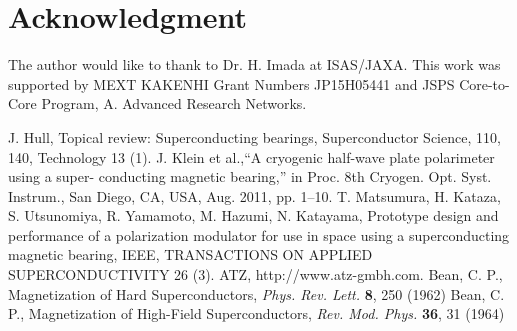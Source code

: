 \documentclass[journal]{IEEEtran}
\begin{document}
\section*{Acknowledgment}
The author would like to thank to Dr. H. Imada at ISAS/JAXA. This work was supported by MEXT KAKENHI Grant Numbers JP15H05441 and JSPS Core-to-Core Program, A. Advanced Research Networks.

\ifCLASSOPTIONcaptionsoff
  \newpage
\fi





%
%
%
\begin{thebibliography}{99}

J. Hull, Topical review: Superconducting bearings, Superconductor Science, 110, 140, Technology 13 (1).
J. Klein et al.,“A cryogenic half-wave plate polarimeter using a super- conducting magnetic bearing,” in Proc. 8th Cryogen. Opt. Syst. Instrum., San Diego, CA, USA, Aug. 2011, pp. 1–10.
T. Matsumura, H. Kataza, S. Utsunomiya, R. Yamamoto, M. Hazumi, N. Katayama, Prototype design and performance of a polarization modulator for use in space using a superconducting magnetic bearing, IEEE, TRANSACTIONS ON APPLIED SUPERCONDUCTIVITY 26 (3).
ATZ, http://www.atz-gmbh.com.
Bean, C. P., Magnetization of Hard Superconductors, {\em Phys. Rev. Lett.\/} {\bf 8}, 250 (1962)
Bean, C. P., Magnetization of High-Field Superconductors, {\em Rev. Mod. Phys.\/} {\bf 36}, 31 (1964)
\end{thebibliography}
\end{document}
